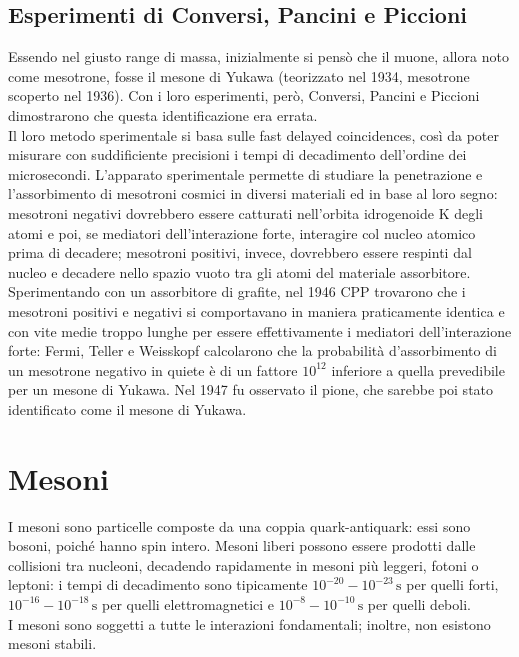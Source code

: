 \subsection{Esperimenti di Conversi, Pancini e Piccioni}

Essendo nel giusto range di massa, inizialmente si pensò che il muone, allora noto come mesotrone, fosse il mesone di Yukawa (teorizzato nel 1934, mesotrone scoperto nel 1936). Con i loro esperimenti, però, Conversi, Pancini e Piccioni dimostrarono che questa identificazione era errata.\\
Il loro metodo sperimentale si basa sulle fast delayed coincidences, così da poter misurare con suddificiente precisioni i tempi di decadimento dell'ordine dei microsecondi. L'apparato sperimentale permette di studiare la penetrazione e l'assorbimento di mesotroni cosmici in diversi materiali ed in base al loro segno: mesotroni negativi dovrebbero essere catturati nell'orbita idrogenoide K degli atomi e poi, se mediatori dell'interazione forte, interagire col nucleo atomico prima di decadere; mesotroni positivi, invece, dovrebbero essere respinti dal nucleo e decadere nello spazio vuoto tra gli atomi del materiale assorbitore.\\
Sperimentando con un assorbitore di grafite, nel 1946 CPP trovarono che i mesotroni positivi e negativi si comportavano in maniera praticamente identica e con vite medie troppo lunghe per essere effettivamente i mediatori dell'interazione forte: Fermi, Teller e Weisskopf calcolarono che la probabilità d'assorbimento di un mesotrone negativo in quiete è di un fattore $ 10^{12} $ inferiore a quella prevedibile per un mesone di Yukawa. Nel 1947 fu osservato il pione, che sarebbe poi stato identificato come il mesone di Yukawa.

\section{Mesoni}

I mesoni sono particelle composte da una coppia quark-antiquark: essi sono bosoni, poiché hanno spin intero. Mesoni liberi possono essere prodotti dalle collisioni tra nucleoni, decadendo rapidamente in mesoni più leggeri, fotoni o leptoni: i tempi di decadimento sono tipicamente $ 10^{-20} - 10^{-23}\,\text{s} $ per quelli forti, $ 10^{-16} - 10^{-18}\,\text{s} $ per quelli elettromagnetici e $ 10^{-8} - 10^{-10}\,\text{s} $ per quelli deboli.\\
I mesoni sono soggetti a tutte le interazioni fondamentali; inoltre, non esistono mesoni stabili.

